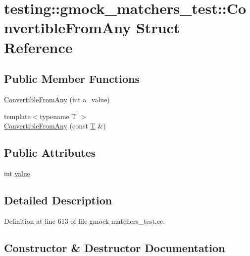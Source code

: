 \hypertarget{structtesting_1_1gmock__matchers__test_1_1_convertible_from_any}{}\section{testing\+:\+:gmock\+\_\+matchers\+\_\+test\+:\+:Convertible\+From\+Any Struct Reference}
\label{structtesting_1_1gmock__matchers__test_1_1_convertible_from_any}
\subsection*{Public Member Functions}
\begin{DoxyCompactItemize}
\item 
\hyperlink{structtesting_1_1gmock__matchers__test_1_1_convertible_from_any_abca53d1044492f06ca3022af48881642}{Convertible\+From\+Any} (int a\+\_\+value)
\item 
{\footnotesize template$<$typename T $>$ }\\\hyperlink{structtesting_1_1gmock__matchers__test_1_1_convertible_from_any_a0963e24be9e1787fd8b9a3a7b7240fc7}{Convertible\+From\+Any} (const \hyperlink{functions__7_8js_adf1f3edb9115acb0a1e04209b7a9937b}{T} \&)
\end{DoxyCompactItemize}
\subsection*{Public Attributes}
\begin{DoxyCompactItemize}
\item 
int \hyperlink{structtesting_1_1gmock__matchers__test_1_1_convertible_from_any_a7d18bc7eb4d6eaae32d581e7c204f917}{value}
\end{DoxyCompactItemize}


\subsection{Detailed Description}


Definition at line 613 of file gmock-\/matchers\+\_\+test.\+cc.



\subsection{Constructor \& Destructor Documentation}
